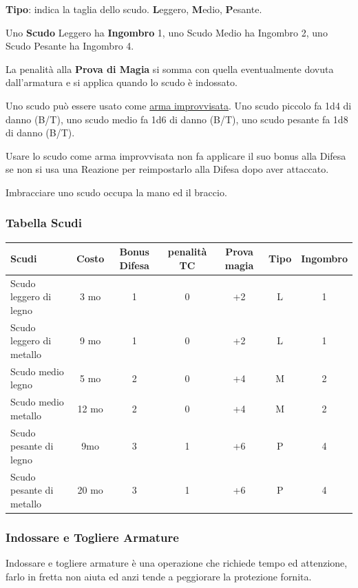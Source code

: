 \begin{multicols}{2}
\textbf{Tipo}: indica la taglia dello scudo. \textbf{L}eggero, \textbf{M}edio, \textbf{P}esante.

Uno \textbf{Scudo} Leggero ha \textbf{Ingombro} 1, uno Scudo Medio ha Ingombro 2, uno Scudo Pesante ha Ingombro 4.

La penalità alla \textbf{Prova di Magia} si somma con quella eventualmente dovuta dall'armatura e si applica quando lo scudo è indossato.

Uno scudo può essere usato come \hyperlink{armaimprovvisata}{arma improvvisata}. Uno scudo piccolo fa 1d4 di danno (B/T), uno scudo medio fa 1d6 di danno (B/T), uno scudo pesante fa 1d8 di danno (B/T).

Usare lo scudo come arma improvvisata non fa applicare il suo bonus alla Difesa se non si usa una Reazione per reimpostarlo alla Difesa dopo aver attaccato.

Imbracciare uno scudo occupa la mano ed il braccio.

\end{multicols}

\subsubsection{Tabella Scudi}

\label{tabella-scudi}

\noindent\begin{tabular}{lcccccc}
\textbf{Scudi} & \textbf{Costo} & \textbf{Bonus Difesa} & \textbf{penalità TC} & \textbf{Prova magia} & \textbf{Tipo} & \textbf{Ingombro}\\
\toprule
Scudo leggero di legno& 3 mo&1& 0& +2& L & 1\\
Scudo leggero di metallo & 9 mo&1& 0& +2& L& 1\\
Scudo medio legno &5 mo &2& 0& +4& M& 2\\
Scudo medio metallo&12 mo&2& 0& +4& M& 2\\
Scudo pesante di legno & 9mo&3 & 1& +6& P& 4\\
Scudo pesante di metallo & 20 mo&3& 1& +6& P& 4\\
\end{tabular}

\begin{multicols}{2}

\subsubsection{Indossare e Togliere Armature}

Indossare e togliere armature è una operazione che richiede tempo ed attenzione, farlo in fretta non aiuta ed anzi tende a peggiorare la protezione fornita.

\end{multicols}

